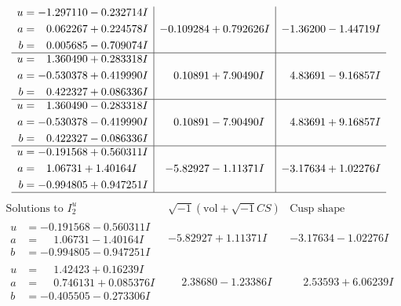 \documentclass[1p]{elsarticle_modified}
\theoremstyle{definition}
\newcommand{\I}{\sqrt{-1}}
\begin{document}
$$\begin{array}{c|c|c}
\begin{aligned}
u &= -1.297110 - 0.232714 I \\
a &= \phantom{-}0.062267 + 0.224578 I \\
b &= \phantom{-}0.005685 - 0.709074 I\end{aligned}
 & -0.109284 + 0.792626 I & -1.36200 - 1.44719 I \\ \hline\begin{aligned}
u &= \phantom{-}1.360490 + 0.283318 I \\
a &= -0.530378 + 0.419990 I \\
b &= \phantom{-}0.422327 + 0.086336 I\end{aligned}
 & \phantom{-}0.10891 + 7.90490 I & \phantom{-}4.83691 - 9.16857 I \\ \hline\begin{aligned}
u &= \phantom{-}1.360490 - 0.283318 I \\
a &= -0.530378 - 0.419990 I \\
b &= \phantom{-}0.422327 - 0.086336 I\end{aligned}
 & \phantom{-}0.10891 - 7.90490 I & \phantom{-}4.83691 + 9.16857 I \\ \hline\begin{aligned}
u &= -0.191568 + 0.560311 I \\
a &= \phantom{-}1.06731 + 1.40164 I \\
b &= -0.994805 + 0.947251 I\end{aligned}
 & -5.82927 - 1.11371 I & -3.17634 + 1.02276 I\\
 \hline 
 \end{array}$$\newpage$$\begin{array}{c|c|c}  
\text{Solutions to }I^u_{2}& \I (\text{vol} + \sqrt{-1}CS) & \text{Cusp shape}\\
 \hline 
\begin{aligned}
u &= -0.191568 - 0.560311 I \\
a &= \phantom{-}1.06731 - 1.40164 I \\
b &= -0.994805 - 0.947251 I\end{aligned}
 & -5.82927 + 1.11371 I & -3.17634 - 1.02276 I \\ \hline\begin{aligned}
u &= \phantom{-}1.42423 + 0.16239 I \\
a &= \phantom{-}0.746131 + 0.085376 I \\
b &= -0.405505 - 0.273306 I\end{aligned}
 & \phantom{-}2.38680 - 1.23386 I & \phantom{-}2.53593 + 6.06239 I \\ \hline\begin{aligned}

\end{aligned}
\end{array}$$
\end{document}
